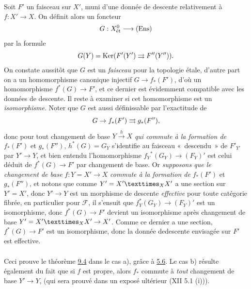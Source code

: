 \documentclass[10pt]{../fichiers-configuration-latex/smfart}
\begin{document}
Soit $F'$ un faisceau sur $X'$, muni d'une donnée de descente
relativement à $f:X'\rightarrow X$. On définit alors un foncteur
$$
G:X^{0}_{\text{\rm ét}}\longrightarrow (\operatorname{Ens})
$$
par la formule
$$
G(Y)=\operatorname{Ker} (F'(Y')\rightrightarrows F''(Y'')){}.
$$
On constate aussitôt que $G$ est un \emph{faisceau} pour la topologie
étale, d'autre part on a un homomorphisme canonique injectif
$G\rightarrow f_{\ast}(F')$, d'où un homomorphisme
$f^{\ast}(G)\rightarrow F'$, et ce dernier est évidemment compatible
avec les données de descente. Il reste à examiner si cet homomorphisme
est un \emph{isomorphisme}. Noter que $G$ est aussi définissable par
l'exactitude de
$$
G\rightarrow f_{\ast}(F')\rightrightarrows g_{\ast}(F''){},
$$
donc pour tout changement de base $Y\xrightarrow{h}X$ \emph{qui
  commute à la formation de} $f_{\ast}(F')$ et $g_{\ast}(F'')$,
$h^{\ast}(G)=G_{Y}$ s'identifie au faisceau « descendu » de
$F'_{Y'}$ par $Y'\rightarrow Y$, et bien entendu l'homomorphisme
$f_{Y}{}^{\ast}(G_{Y})\rightarrow (F_{Y})'$ est celui déduit de
$f^{\ast}(G)\rightarrow F'$ par changement de base. Or \emph{supposons
  que le changement de base} $f:Y=X'\rightarrow X$ \emph{commute à la
  formation de} $f_{\ast}(F')$ et $g_{\ast}(F'')$, et notons que comme
$Y'=\fprod{X'}{X'}{X}$ a une section sur $Y'=X'$, donc $Y'\rightarrow
Y$ est un morphisme de descente \emph{effective} pour toute catégorie
fibrée, en particulier pour $\mathcal{F}$, il s'ensuit que
$f^{\ast}_{Y}(G_{Y})\rightarrow (F_{Y})'$ est un isomorphisme, donc
$f^{\ast}(G)\rightarrow F'$ devient un isomorphisme après changement
de base $Y'=\fprod{X'}{X'}{X}\rightarrow X'$. Comme ce dernier a une
section, $f^{\ast}(G)\rightarrow F'$ est un isomorphisme, donc la
donnée de\pageoriginale  descente envisagée sur $F'$ est effective.

\subsubsection{}

Ceci prouve le théorème \hyperref[VIII.thm9.4]{9.4} dans le cas a), grâce à \hyperref[VIII.cor5.6]{5.6}. Le cas b)
résulte également du fait que si $f$ est propre, alors $f_{\ast}$
commute à \emph{tout} changement de base $Y'\rightarrow Y$, (qui sera
prouvé dans un exposé ultérieur (XII 5.1 (i))).

\subsubsection{}
\end{document}
